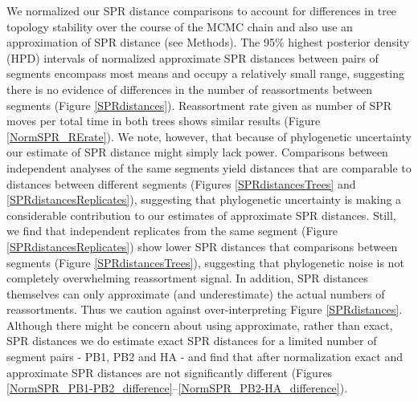 \documentclass[11pt,oneside,letterpaper]{article}
\begin{document}
We normalized our SPR distance comparisons to account for differences in tree topology stability over the course of the MCMC chain and also use an approximation of SPR distance \citep{whidden2009,whidden2010,whidden2013} (see Methods).
The 95\% highest posterior density (HPD) intervals of normalized approximate SPR distances between pairs of segments encompass most means and occupy a relatively small range, suggesting there is no evidence of differences in the number of reassortments between segments (Figure \ref{SPRdistances}).
Reassortment rate given as number of SPR moves per total time in both trees shows similar results (Figure \ref{NormSPR_RErate}).
We note, however, that because of phylogenetic uncertainty our estimate of SPR distance might simply lack power.
Comparisons between independent analyses of the same segments yield distances that are comparable to distances between different segments (Figures \ref{SPRdistancesTrees} and \ref{SPRdistancesReplicates}), suggesting that phylogenetic uncertainty is making a considerable contribution to our estimates of approximate SPR distances.
Still, we find that independent replicates from the same segment (Figure \ref{SPRdistancesReplicates}) show lower SPR distances that comparisons between segments (Figure \ref{SPRdistancesTrees}), suggesting that phylogenetic noise is not completely overwhelming reassortment signal.
In addition, SPR distances themselves can only approximate (and underestimate) the actual numbers of reassortments.
Thus we caution against over-interpreting Figure \ref{SPRdistances}.
Although there might be concern about using approximate, rather than exact, SPR distances we do estimate exact SPR distances for a limited number of segment pairs - PB1, PB2 and HA - and find that after normalization exact and approximate SPR distances are not significantly different (Figures \ref{NormSPR_PB1-PB2_difference}--\ref{NormSPR_PB2-HA_difference}).
\end{document}

